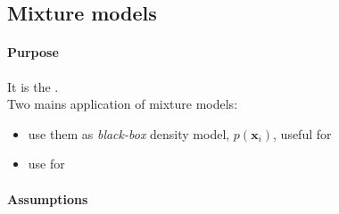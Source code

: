 \subsection{Mixture models}
\paragraph{Purpose}
It is the .\\
Two mains application of mixture models:
\begin{itemize}
    \item use them as \emph{black-box} density model, $p(\bm{x}_{i})$, useful for 
    \item use for 
\end{itemize}

\paragraph{Assumptions}
